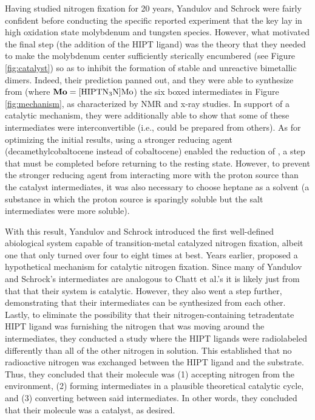 \documentclass[titlepage,12pt]{article}
\begin{document}
Having studied nitrogen fixation for 20 years, Yandulov and Schrock were fairly confident before conducting the specific reported experiment that the key lay in high oxidation state molybdenum and tungsten species. However, what motivated the final step (the addition of the HIPT ligand) was the theory that they needed to make the molybdenum center sufficiently sterically encumbered (see Figure \ref{fig:catalyst}) so as to inhibit the formation of stable and unreactive bimetallic dimers. Indeed, their prediction panned out, and they were able to synthesize from  (where $\ce{\textbf{Mo}}=\ce{[HIPTN3N]Mo}$) the six boxed intermediates in Figure \ref{fig:mechanism}, as characterized by NMR and x-ray studies. In support of a catalytic mechanism, they were additionally able to show that some of these intermediates were interconvertible (i.e., could be prepared from others). As for optimizing the initial results, using a stronger reducing agent (decamethylcobaltocene instead of cobaltocene) enabled the reduction of \ce{[\textbf{Mo}(NH3)]+}, a step that must be completed before returning to the  resting state. However, to prevent the stronger reducing agent from interacting more with the proton source than the catalyst intermediates, it was also necessary to choose heptane as a solvent (a substance in which the proton source is sparingly soluble but the  salt intermediates were more soluble).\par
With this result, Yandulov and Schrock introduced the first well-defined abiological system capable of transition-metal catalyzed nitrogen fixation, albeit one that only turned over four to eight times at best. Years earlier, \textcite{bib:Chatt} proposed a hypothetical mechanism for catalytic nitrogen fixation. Since many of Yandulov and Schrock’s intermediates are analogous to Chatt et al.’s it is likely just from that that their system is catalytic. However, they also went a step further, demonstrating that their intermediates can be synthesized from each other. Lastly, to eliminate the possibility that their nitrogen-containing tetradentate HIPT ligand was furnishing  the nitrogen that was moving around the intermediates, they conducted a study where the HIPT ligands were radiolabeled differently than all of the other nitrogen in solution. This established that no radioactive nitrogen was exchanged between the HIPT ligand and the substrate. Thus, they concluded that their  molecule was (1) accepting nitrogen from the environment, (2) forming intermediates in a plausible theoretical catalytic cycle, and (3) converting between said intermediates. In other words, they concluded that their molecule was a catalyst, as desired.
\end{document}
